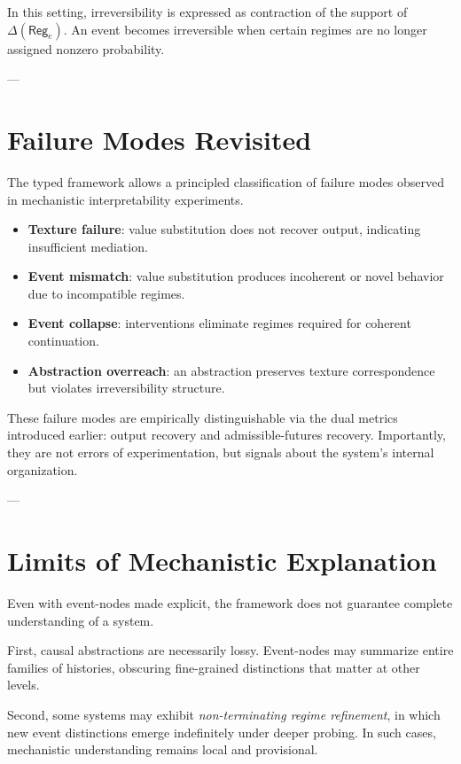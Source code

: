 \documentclass[11pt]{article}
\theoremstyle{remark}
\newcommand{\Reg}{\mathsf{Reg}}
\begin{document}
In this setting, irreversibility is expressed as contraction of the support of \(\Delta(\Reg_e)\). An event becomes irreversible when certain regimes are no longer assigned nonzero probability.

---

\section{Failure Modes Revisited}

The typed framework allows a principled classification of failure modes observed in mechanistic interpretability experiments.

\begin{itemize}
\item \textbf{Texture failure}: value substitution does not recover output, indicating insufficient mediation.
\item \textbf{Event mismatch}: value substitution produces incoherent or novel behavior due to incompatible regimes.
\item \textbf{Event collapse}: interventions eliminate regimes required for coherent continuation.
\item \textbf{Abstraction overreach}: an abstraction preserves texture correspondence but violates irreversibility structure.
\end{itemize}

These failure modes are empirically distinguishable via the dual metrics introduced earlier: output recovery and admissible-futures recovery. Importantly, they are not errors of experimentation, but signals about the system’s internal organization.

---

\section{Limits of Mechanistic Explanation}

Even with event-nodes made explicit, the framework does not guarantee complete understanding of a system.

First, causal abstractions are necessarily lossy. Event-nodes may summarize entire families of histories, obscuring fine-grained distinctions that matter at other levels.

Second, some systems may exhibit \emph{non-terminating regime refinement}, in which new event distinctions emerge indefinitely under deeper probing. In such cases, mechanistic understanding remains local and provisional.
\end{document}
